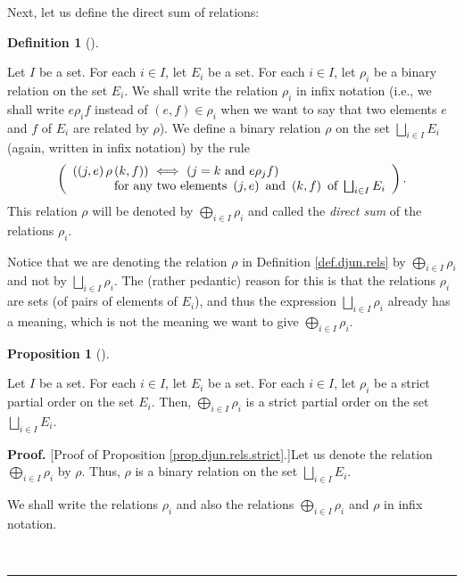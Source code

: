 \documentclass[numbers=enddot,12pt,final,onecolumn,notitlepage,abstracton]{scrartcl}
\theoremstyle{definition}
\newtheorem{prop}[theo]{Proposition}
\newenvironment{proposition}[1][]
{\begin{prop}[#1]\begin{leftbar}}
{\end{leftbar}\end{prop}}
\newtheorem{defi}[theo]{Definition}
\newenvironment{definition}[1][]
{\begin{defi}[#1]\begin{leftbar}}
{\end{leftbar}\end{defi}}
\newenvironment{proof}[1][Proof]{\noindent\textbf{#1.} }{\ \rule{0.5em}{0.5em}}
\newenvironment{verlong}{}{}
\begin{document}
\begin{verlong}
\begin{footnotesize}
Next, let us define the direct sum of relations:

\Needspace{4cm}
\begin{definition}
\label{def.djun.rels}Let $I$ be a set. For each $i\in I$, let $E_{i}$ be a
set. For each $i\in I$, let $\rho_{i}$ be a binary relation on the set $E_{i}%
$. We shall write the relation $\rho_{i}$ in infix notation (i.e., we shall
write $e\rho_{i}f$ instead of $\left(  e,f\right)  \in\rho_{i}$ when we want
to say that two elements $e$ and $f$ of $E_{i}$ are related by $\rho$). We
define a binary relation $\rho$ on the set $\bigsqcup_{i\in I}E_{i}$ (again,
written in infix notation) by the rule%
\[
\left(
\begin{array}
[c]{l}%
\left(  \left(  j,e\right)  \rho\left(  k,f\right)  \right)
\ \Longleftrightarrow\ \left(  j=k\text{ and }e\rho_{j}f\right) \\
\ \ \ \ \ \ \ \ \ \ \text{for any two elements }\left(  j,e\right)  \text{ and
}\left(  k,f\right)  \text{ of }\bigsqcup_{i\in I}E_{i}%
\end{array}
\right)  .
\]
This relation $\rho$ will be denoted by $\bigoplus_{i\in I}\rho_{i}$ and
called the \textit{direct sum} of the relations $\rho_{i}$.
\end{definition}

Notice that we are denoting the relation $\rho$ in Definition
\ref{def.djun.rels} by $\bigoplus_{i\in I}\rho_{i}$ and not by $\bigsqcup
_{i\in I}\rho_{i}$. The (rather pedantic) reason for this is that the
relations $\rho_{i}$ are sets (of pairs of elements of $E_{i}$), and thus the
expression $\bigsqcup_{i\in I}\rho_{i}$ already has a meaning, which is not
the meaning we want to give $\bigoplus_{i\in I}\rho_{i}$.

\begin{proposition}
\label{prop.djun.rels.strict}Let $I$ be a set. For each $i\in I$, let $E_{i}$
be a set. For each $i\in I$, let $\rho_{i}$ be a strict partial order on the
set $E_{i}$. Then, $\bigoplus_{i\in I}\rho_{i}$ is a strict partial order on
the set $\bigsqcup_{i\in I}E_{i}$.
\end{proposition}

\begin{proof}
[Proof of Proposition \ref{prop.djun.rels.strict}.]Let us denote the relation
$\bigoplus_{i\in I}\rho_{i}$ by $\rho$. Thus, $\rho$ is a binary relation on
the set $\bigsqcup_{i\in I}E_{i}$.

We shall write the relations $\rho_{i}$ and also the relations $\bigoplus
_{i\in I}\rho_{i}$ and $\rho$ in infix notation.


\end{proof}
\end{footnotesize}
\end{verlong}
\end{document}
